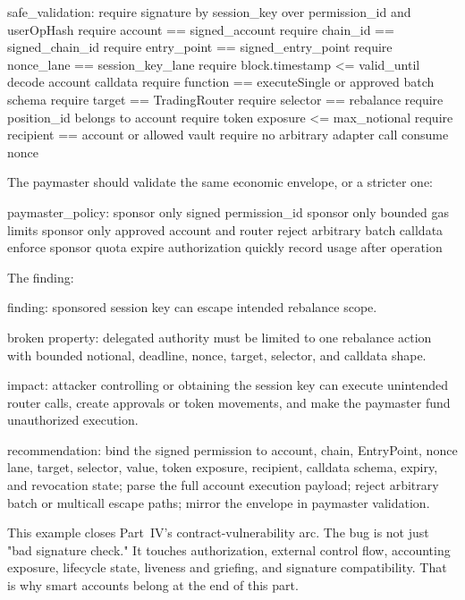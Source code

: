 \begin{codeblock}
safe_validation:
    require signature by session_key over permission_id and userOpHash
    require account == signed_account
    require chain_id == signed_chain_id
    require entry_point == signed_entry_point
    require nonce_lane == session_key_lane
    require block.timestamp <= valid_until
    decode account calldata
    require function == executeSingle or approved batch schema
    require target == TradingRouter
    require selector == rebalance
    require position_id belongs to account
    require token exposure <= max_notional
    require recipient == account or allowed vault
    require no arbitrary adapter call
    consume nonce
\end{codeblock}

The paymaster should validate the same economic envelope, or a stricter one:

\begin{codeblock}
paymaster_policy:
    sponsor only signed permission_id
    sponsor only bounded gas limits
    sponsor only approved account and router
    reject arbitrary batch calldata
    enforce sponsor quota
    expire authorization quickly
    record usage after operation
\end{codeblock}

The finding:

\begin{codeblock}
finding:
    sponsored session key can escape intended rebalance scope.

broken property:
    delegated authority must be limited to one rebalance action with
    bounded notional, deadline, nonce, target, selector, and calldata shape.

impact:
    attacker controlling or obtaining the session key can execute unintended
    router calls, create approvals or token movements, and make the paymaster
    fund unauthorized execution.

recommendation:
    bind the signed permission to account, chain, EntryPoint, nonce lane,
    target, selector, value, token exposure, recipient, calldata schema,
    expiry, and revocation state; parse the full account execution payload;
    reject arbitrary batch or multicall escape paths; mirror the envelope in
    paymaster validation.
\end{codeblock}

This example closes Part~IV's contract-vulnerability arc. The bug is not just "bad signature check." It touches authorization, external control flow, accounting exposure, lifecycle state, liveness and griefing, and signature compatibility. That is why smart accounts belong at the end of this part.

